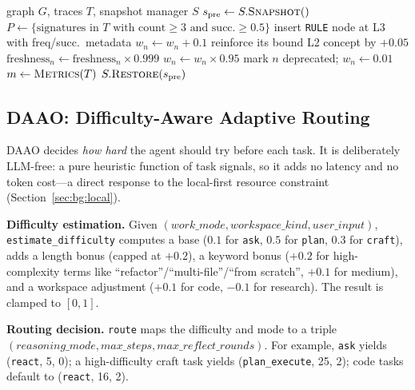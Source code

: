 \documentclass[sigconf]{acmart}
\begin{document}
\begin{algorithm}[t]
\caption{MFP Hill-Climbing Stage}\label{alg:mfp}
\begin{algorithmic}[1]
\REQUIRE graph $G$, traces $T$, snapshot manager $S$
\STATE $s_{\text{pre}} \gets S.\textsc{Snapshot}()$ 
\STATE $P \gets \{\text{signatures in } T \text{ with count}\geq 3 \text{ and succ.}\geq 0.5\}$
    \STATE insert \texttt{RULE} node at L3 with freq/succ.\ metadata
  \ENDIF
\ENDFOR
{}
  \STATE $w_n \gets w_n + 0.1$ 
\ENDFOR
{}
  \STATE reinforce its bound L2 concept by $+0.05$
\ENDFOR
{}
  \STATE $\text{freshness}_n \gets \text{freshness}_n \times 0.999$
   $w_n \gets w_n \times 0.95$ \ENDIF
   mark $n$ deprecated; $w_n \gets 0.01$ \ENDIF
\ENDFOR
\STATE $m \gets \textsc{Metrics}(T)$
 \STATE $S.\textsc{Restore}(s_{\text{pre}})$ \ENDIF
\end{algorithmic}
\end{algorithm}

\subsection{DAAO: Difficulty-Aware Adaptive Routing}\label{sec:daao}

DAAO decides \emph{how hard} the agent should try before each task. It is deliberately LLM-free: a pure heuristic function of task signals, so it adds no latency and no token cost---a direct response to the local-first resource constraint (Section~\ref{sec:bg:local}).

\textbf{Difficulty estimation.} Given $(\textit{work\_mode}, \textit{workspace\_kind}, \textit{user\_input})$, \texttt{estimate\_difficulty} computes a base ($0.1$ for \texttt{ask}, $0.5$ for \texttt{plan}, $0.3$ for \texttt{craft}), adds a length bonus (capped at $+0.2$), a keyword bonus ($+0.2$ for high-complexity terms like ``refactor''/``multi-file''/``from scratch'', $+0.1$ for medium), and a workspace adjustment ($+0.1$ for code, $-0.1$ for research). The result is clamped to $[0,1]$.

\textbf{Routing decision.} \texttt{route} maps the difficulty and mode to a triple $(\textit{reasoning\_mode}, \textit{max\_steps}, \textit{max\_reflect\_rounds})$. For example, \texttt{ask} yields (\texttt{react}, 5, 0); a high-difficulty craft task yields (\texttt{plan\_execute}, 25, 2); code tasks default to (\texttt{react}, 16, 2).
\end{document}
